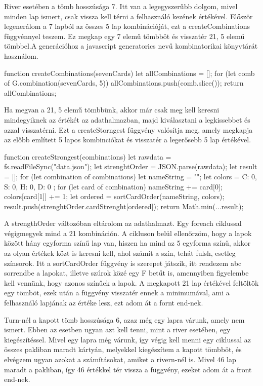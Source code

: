 River esetében a tömb hosszúsága 7. Itt van a legegyszerűbb dolgom, mivel minden lap ismert, csak vissza kell térni a felhasználó kezének értékével. Először legenerálom a 7 lapból az összes 5 lap kombinációját, ezt a createCombinations függvénnyel teszem. Ez megkap egy 7 elemű tömbböt és visszatér 21, 5 elemű tömbbel.A generációhoz a javascript generatorics nevű kombinatorikai könyvtárát használom.

\begin{python}
function createCombinations(sevenCards) {
  let allCombinations = [];
  for (let comb of G.combination(sevenCards, 5)) {
    allCombinations.push(comb.slice());
  }
  return allCombinations;
}
\end{python}

Ha megvan a 21, 5 elemű tömbbünk, akkor már csak meg kell keresni mindegyiknek az értékét az adathalmazban, majd kiválasztani a legkissebbet és azzal visszatérni. Ezt a createStorngest függvény valósítja meg, amely megkapja az előbb említett 5 lapos kombinciókat és visszatér a legerősebb 5 lap értékével.

\begin{python}
function createStrongest(combinations){
  let rawdata = fs.readFileSync("data.json");
  let strenghtOrder = JSON.parse(rawdata);
  let result =  [];
  for (let combination of combinations) {
    let nameString = "";
    let colors = { C: 0, S: 0, H: 0, D: 0 };
    for (let card of combination) {
      nameString += card[0];
      colors[card[1]] += 1;
    }
    let ordered = sortCardOrder(nameString, colors);
    result.push(strenghtOrder.cardStrenght[ordered]);
  }
  return Math.min(...result);
}
\end{python}

A strengthOrder változóban eltárolom az adathalmazt. Egy foreach ciklussal végigmegyek mind a 21 kombináción. A cikluson belül ellenőrzöm, hogy a lapok között hány egyforma színű lap van, hiszen ha mind az 5 egyforma színű, akkor az olyan értékek közt is keresni kell, ahol számít a szín, tehát fulsh, esetleg színsorok. Itt a sortCardOrder függvény is szerepet játszik, itt rendezem abc sorrendbe a lapokat, illetve szúrok közé egy F betűt is, amennyiben figyelembe kell vennünk, hogy azonos színűek a lapok. A megkapott 21 lap értékével feltöltök egy tömböt, ezek után a függvény visszatér ennek a minimumával, ami a felhasználó lapjának az értéke lesz, ezt adom át a fornt end-nek.

Turn-nél a kapott tömb hosszúsága 6, azaz még egy lapra várunk, amely nem ismert. Ebben az esetben ugyan azt kell tenni, mint a river esetében, egy kiegészítéssel. Mivel egy lapra még várunk, így végig kell menni egy ciklussal az összes pakliban maradt kártyán, melyekkel kiegészítem a kapott tömbböt, és elvégzem ugyan azokat a számításokat, amiket a rivern-nél is. Mivel 46 lap maradt a pakliban, így 46 értékkel tér vissza a függvény, ezeket adom át a front end-nek.

